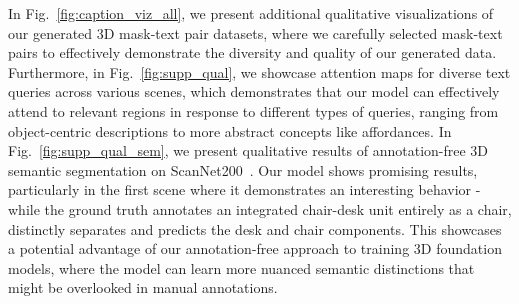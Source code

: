 In Fig.~\ref{fig:caption_viz_all}, we present additional qualitative visualizations of our generated 3D mask-text pair datasets, where we carefully selected mask-text pairs to effectively demonstrate the diversity and quality of our generated data.
Furthermore, in Fig.~\ref{fig:supp_qual}, we showcase attention maps for diverse text queries across various scenes, which demonstrates that our model can effectively attend to relevant regions in response to different types of queries, ranging from object-centric descriptions to more abstract concepts like affordances.
In Fig.~\ref{fig:supp_qual_sem}, we present qualitative results of annotation-free 3D semantic segmentation on ScanNet200~\cite{scannet200}.
Our model shows promising results, particularly in the first scene where it demonstrates an interesting behavior - while the ground truth annotates an integrated chair-desk unit entirely as a chair, \nickname distinctly separates and predicts the desk and chair components.
This showcases a potential advantage of our annotation-free approach to training 3D foundation models, where the model can learn more nuanced semantic distinctions that might be overlooked in manual annotations.

\clearpage

\clearpage

\clearpage
